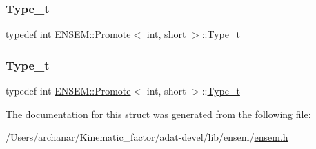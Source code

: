 \subsubsection{\texorpdfstring{Type\_t}{Type\_t}\hspace{0.1cm}{\footnotesize\ttfamily [2/3]}}
{\footnotesize\ttfamily typedef int \mbox{\hyperlink{structENSEM_1_1Promote}{E\+N\+S\+E\+M\+::\+Promote}}$<$ int, short $>$\+::\mbox{\hyperlink{structENSEM_1_1Promote_3_01int_00_01short_01_4_ad2e469fb4504abcc6e15dac9af8a8078}{Type\+\_\+t}}}

\mbox{\label{structENSEM_1_1Promote_3_01int_00_01short_01_4_ad2e469fb4504abcc6e15dac9af8a8078}} 
\subsubsection{\texorpdfstring{Type\_t}{Type\_t}\hspace{0.1cm}{\footnotesize\ttfamily [3/3]}}
{\footnotesize\ttfamily typedef int \mbox{\hyperlink{structENSEM_1_1Promote}{E\+N\+S\+E\+M\+::\+Promote}}$<$ int, short $>$\+::\mbox{\hyperlink{structENSEM_1_1Promote_3_01int_00_01short_01_4_ad2e469fb4504abcc6e15dac9af8a8078}{Type\+\_\+t}}}



The documentation for this struct was generated from the following file\+:\begin{DoxyCompactItemize}
\item 
/\+Users/archanar/\+Kinematic\+\_\+factor/adat-\/devel/lib/ensem/\mbox{\hyperlink{adat-devel_2lib_2ensem_2ensem_8h}{ensem.\+h}}\end{DoxyCompactItemize}
